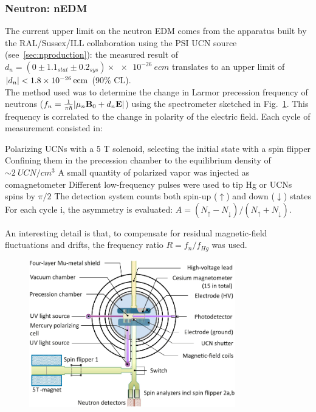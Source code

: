 \begin{refsection}
        \subsubsection{Neutron: nEDM}
            The current upper limit on the neutron EDM comes from the apparatus built by the  RAL/Sussex/ILL collaboration \cite{nEDM} using the PSI UCN source (see~\ref{sec:nproduction}): the measured result of $d_n = (0\pm1.1_{stat}\pm0.2_{sys})\times\SI{e-26}{e cm}$ translates to an upper limit of $\abs{d_n} < \SI{1.8e-26}{ecm}$ (90\% CL).\\
            The method used was to determine the change in Larmor precession frequency of neutrons ($f_n = \frac{1}{\pi\hbar}\abs{\mu_n\textbf{B}_0+d_n\textbf{E}}$) using the spectrometer sketched in Fig.~\ref{fig:nEDM}.
            This frequency is correlated to the change in polarity of the electric field.
            Each cycle of measurement consisted in:
            \begin{outline}
                \1 Polarizing UCNs with a 5 T solenoid, selecting the initial state with a spin flipper
                \1 Confining them in the precession chamber to the equilibrium density of $\sim\SI{2}{UCN/cm^3}$
                \1 A small quantity of polarized  vapor was injected as comagnetometer
                \1 Different low-frequency pulses were used to tip Hg or UCNs spins by $\pi/2$
                \1 The detection system counts both spin-up ($\uparrow$) and down ($\downarrow$) states
                \1 For each cycle i, the asymmetry is evaluated: $ A = (N_\uparrow-N_\downarrow)/(N_\uparrow+N_\downarrow)$.
            \end{outline}
            An interesting detail is that, to compensate for residual magnetic-field fluctuations and drifts, the frequency ratio $R = f_n/f_{Hg}$ was used.
            
            \begin{figure}
                \centering
                \includegraphics[width = 0.8\textwidth]{Figures/Introduction/nEDM.png}
                \caption{}
                \label{fig:nEDM}
            \end{figure}
            

\end{refsection}
